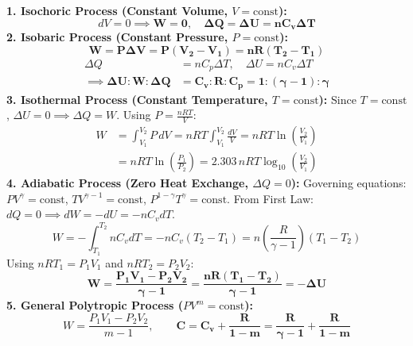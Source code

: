 \documentclass[10pt,twoside,openright]{book}
\begin{document}
\begin{formulabox}
\textbf{1. Isochoric Process (Constant Volume, $V = \text{const}$):}
\begin{equation}
  dV = 0 \implies \mathbf{W = 0}, \quad \mathbf{\Delta Q = \Delta U = n C_v \Delta T}
\end{equation}
\textbf{2. Isobaric Process (Constant Pressure, $P = \text{const}$):}
\begin{equation}
  \mathbf{W = P \Delta V = P(V_2 - V_1) = n R (T_2 - T_1)}
\end{equation}
\begin{align}
  \Delta Q &= n C_p \Delta T, \quad \Delta U = n C_v \Delta T \\
  \implies \mathbf{\Delta U : W : \Delta Q} &= \mathbf{C_v : R : C_p = 1 : (\gamma - 1) : \gamma}
\end{align}
\textbf{3. Isothermal Process (Constant Temperature, $T = \text{const}$):}
Since $T = \text{const}$, $\Delta U = 0 \implies \Delta Q = W$. Using $P = \frac{nRT}{V}$:
\begin{align}
  W &= \int_{V_1}^{V_2} P\,dV = n R T \int_{V_1}^{V_2} \frac{dV}{V} = n R T \ln\left(\frac{V_2}{V_1}\right) \\
  &= n R T \ln\left(\frac{P_1}{P_2}\right) = 2.303\,n R T \log_{10}\left(\frac{V_2}{V_1}\right)
\end{align}
\textbf{4. Adiabatic Process (Zero Heat Exchange, $\Delta Q = 0$):}
Governing equations: $P V^\gamma = \text{const}$, $T V^{\gamma-1} = \text{const}$, $P^{1-\gamma} T^\gamma = \text{const}$.
From First Law: $dQ = 0 \implies dW = -dU = -n C_v dT$.
\begin{equation}
  W = -\int_{T_1}^{T_2} n C_v dT = -n C_v (T_2 - T_1) = n \left(\frac{R}{\gamma - 1}\right)(T_1 - T_2)
\end{equation}
Using $nRT_1 = P_1 V_1$ and $nRT_2 = P_2 V_2$:
\begin{equation}
  \mathbf{W = \frac{P_1 V_1 - P_2 V_2}{\gamma - 1} = \frac{n R (T_1 - T_2)}{\gamma - 1} = -\Delta U}
\end{equation}
\textbf{5. General Polytropic Process ($P V^m = \text{const}$):}
\begin{equation}
  W = \frac{P_1 V_1 - P_2 V_2}{m - 1}, \qquad \mathbf{C = C_v + \frac{R}{1 - m} = \frac{R}{\gamma - 1} + \frac{R}{1 - m}}
\end{equation}
\end{formulabox}
\end{document}
